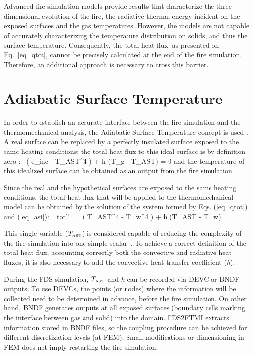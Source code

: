\documentclass[11pt]{book}
\begin{document}
Advanced fire simulation models provide results that characterize the three dimensional evolution of the fire, the radiative thermal energy incident on the exposed surfaces and the gas temperatures. However, the models are not capable of accurately characterizing the temperature distribution on solids, and thus the surface temperature. Consequently, the total heat flux, as presented on Eq.~\ref{eq_qtot}, cannot be precisely calculated at the end of the fire simulation. Therefore, an additional approach is necessary to cross this barrier.

\section{Adiabatic Surface Temperature}

In order to establish an accurate interface between the fire simulation and the thermomechanical analysis, the Adiabatic Surface Temperature concept is used \cite{Wickstrom:Interflam2007}. A real surface can be replaced by a perfectly insulated surface exposed to the same heating conditions; the total heat flux to this ideal surface is by definition zero :
\be \label{eq_ast} \epsilon \, \left( {e}_{\rm inc} - \sigma T_{\hbox{\tiny AST}}^4 \right) + h (T_{\rm g} - T_{\hbox{\tiny AST}}) = 0  \ee 
and the temperature of this idealized surface can be obtained as an output from the fire simulation.

Since the real and the hypothetical surfaces are exposed to the same heating conditions, the total heat flux that will be applied to the thermomechanical model can be obtained by the solution of the system formed by Eqs. (\ref{eq_qtot}) and (\ref{eq_ast}):
\be \label{eq_ftmi}_{\rm tot}'' = \epsilon \sigma \, \left( T_{\hbox{\tiny AST}}^4 - T_{\rm w}^4 \right) + h (T_{\hbox{\tiny AST}} - T_{\rm w})  \ee

This single variable ($T_{\hbox{\tiny AST}}$) is considered capable of reducing the complexity of the fire simulation into one simple scalar~\cite{FTMI:Duthinh,FTMI:Sandstrom,FTMI:Wickstrom2010}. To achieve a correct definition of the total heat flux, accounting correctly both the convective and radiative heat fluxes, it is also necessary to add the convective heat transfer coefficient (\textit{h}). 
 
During the FDS simulation, $T_{\hbox{\tiny AST}}$ and $h$ can be recorded via {\ct DEVC} or {\ct BNDF} outputs. To use {\ct DEVC}s, the points (or nodes) where the information will be collected need to be determined in advance, before the fire simulation. On other hand, {\ct BNDF} generates outputs at all exposed surfaces (boundary cells marking the interface between gas and solid) into the domain. FDS2FTMI extracts information stored in {\ct BNDF} files, so the coupling procedure can be achieved for different discretization levels (at FEM). Small modifications or dimensioning in FEM does not imply restarting the fire simulation. 
\end{document}
